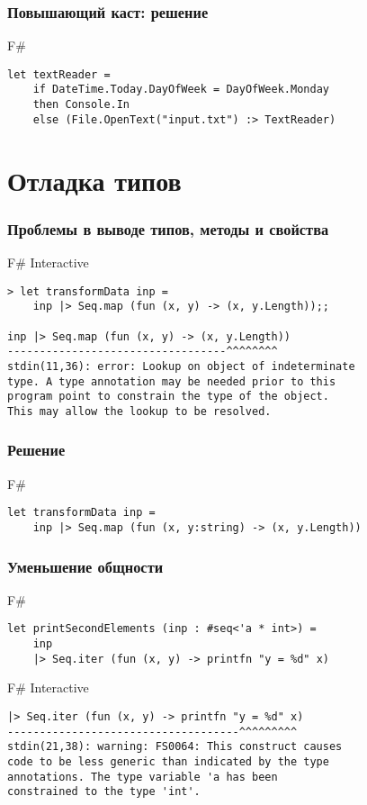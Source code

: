 \documentclass[xetex,mathserif,serif]{beamer}
\begin{document}
	\begin{frame}[fragile]
		\frametitle{Повышающий каст: решение}
		\begin{exampleblock}{F\#}
			\begin{lstlisting}
let textReader =
    if DateTime.Today.DayOfWeek = DayOfWeek.Monday
    then Console.In
    else (File.OpenText("input.txt") :> TextReader)
\end{lstlisting}
\end{exampleblock}
\end{frame}

	\section{Отладка типов}

	\begin{frame}[fragile]
		\frametitle{Проблемы в выводе типов, методы и свойства}
\begin{alertblock}{F\# Interactive}
\begin{lstlisting}[keywordstyle=\color{black}]
> let transformData inp =
    inp |> Seq.map (fun (x, y) -> (x, y.Length));;

inp |> Seq.map (fun (x, y) -> (x, y.Length))
----------------------------------^^^^^^^^
stdin(11,36): error: Lookup on object of indeterminate 
type. A type annotation may be needed prior to this 
program point to constrain the type of the object. 
This may allow the lookup to be resolved.
\end{lstlisting}
\end{alertblock}
\end{frame}

	\begin{frame}[fragile]
		\frametitle{Решение}
		\begin{exampleblock}{F\#}
			\begin{lstlisting}
let transformData inp =
    inp |> Seq.map (fun (x, y:string) -> (x, y.Length))
\end{lstlisting}
\end{exampleblock}
\end{frame}

	\begin{frame}[fragile]
		\frametitle{Уменьшение общности}
		\begin{exampleblock}{F\#}
			\begin{lstlisting}
let printSecondElements (inp : #seq<'a * int>) =
    inp
    |> Seq.iter (fun (x, y) -> printfn "y = %d" x)
\end{lstlisting}
\end{exampleblock}

\begin{alertblock}{F\# Interactive}
\begin{lstlisting}[keywordstyle=\color{black}]
|> Seq.iter (fun (x, y) -> printfn "y = %d" x)
------------------------------------^^^^^^^^^
stdin(21,38): warning: FS0064: This construct causes 
code to be less generic than indicated by the type 
annotations. The type variable 'a has been 
constrained to the type 'int'.
\end{lstlisting}
\end{alertblock}
\end{frame}
\end{document}
